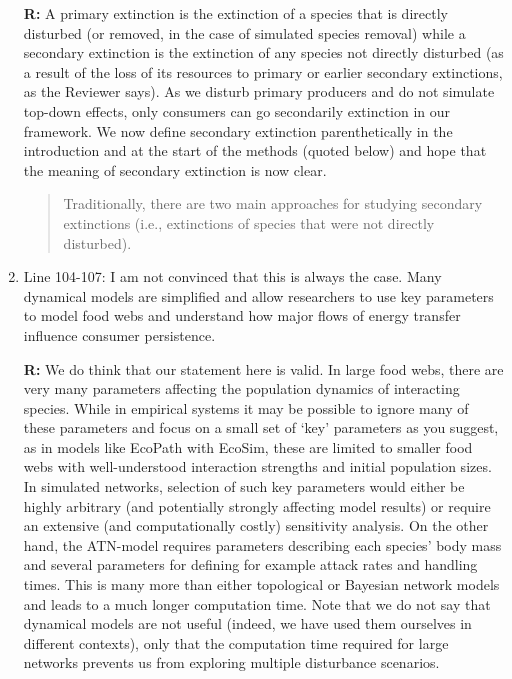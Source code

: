\documentclass[12pt]{article}
\begin{document}
\begin{enumerate}
                \textbf{R:} A primary extinction is the extinction of a species that is directly disturbed (or removed, in the case of simulated species removal) while a secondary extinction is the extinction of any species not directly disturbed (as a result of the loss of its resources to primary or earlier secondary extinctions, as the Reviewer says). As we disturb primary producers and do not simulate top-down effects, only consumers can go secondarily extinction in our framework. We now define secondary extinction parenthetically in the introduction and at the start of the methods (quoted below) and hope that the meaning of secondary extinction is now clear.

                \begin{quotation} 
                Traditionally, there are two main approaches for studying secondary extinctions (i.e., extinctions of species that were not directly disturbed). 
                \end{quotation}

            \item Line 104-107: I am not convinced that this is always the case. Many dynamical models are simplified and allow researchers to use key parameters to model food webs and understand how major flows of energy transfer influence consumer persistence.

                \textbf{R:} We do think that our statement here is valid. In large food webs, there are very many parameters affecting the population dynamics of interacting species. While in empirical systems it may be possible to ignore many of these parameters and focus on a small set of `key' parameters as you suggest, as in models like EcoPath with EcoSim, these are limited to smaller food webs with well-understood interaction strengths and initial population sizes.
                In simulated networks, selection of such key parameters would either be highly arbitrary (and potentially strongly affecting model results) or require an extensive (and computationally costly) sensitivity analysis. 
                On the other hand, the ATN-model requires parameters describing each species' body mass and several parameters for defining for example attack rates and handling times. 
                This is many more than either topological or Bayesian network models and leads to a much longer computation time.
                Note that we do not say that dynamical models are not useful (indeed, we have used them ourselves in different contexts), only that the computation time required for large networks prevents us from exploring multiple disturbance scenarios.



\end{enumerate}
\end{document}
